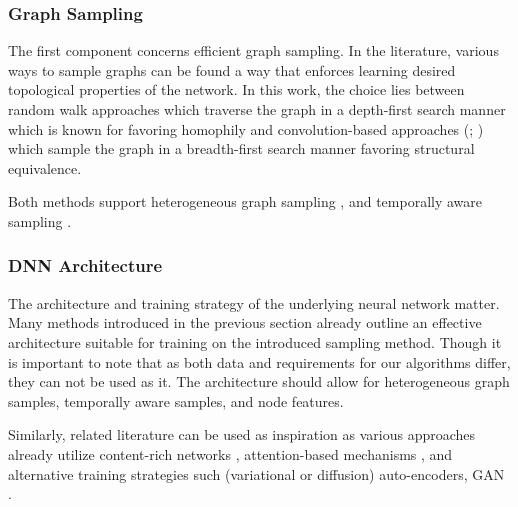 \documentclass[
acmsmall,
nonacm,
screen,
acmthm]{acmart}
\begin{document}
\hypertarget{graph-sampling}{%
\subsubsection{Graph Sampling}\label{graph-sampling}}

The first component concerns efficient graph sampling. In the
literature, various ways to sample graphs can be found a way that
enforces learning desired topological properties of the network. In this
work, the choice lies between random walk approaches
\citep{perozziDeepWalkOnlineLearning2014, groverNode2vecScalableFeature2016, groverNode2vecScalableFeature2016}
which traverse the graph in a depth-first search manner which is known
for favoring homophily and convolution-based approaches
(\citet{kipfSemiSupervisedClassificationGraph2017a};
\citet{hamiltonInductiveRepresentationLearning2018}) which sample the
graph in a breadth-first search manner favoring structural equivalence.

Both methods support heterogeneous graph sampling
\citep{wuAuthor2VecFrameworkGenerating2020, yingGraphConvolutionalNeural2018, yangHeterogeneousNetworkRepresentation2020, dongMetapath2vecScalableRepresentation2017, wangHeterogeneousGraphAttention2021},
and temporally aware sampling
\citep{nguyenContinuousTimeDynamicNetwork2018, wuSageDyNovelSampling2021, dasguptaHyTEHyperplanebasedTemporally2018}.

\hypertarget{dnn-architecture}{%
\subsubsection{DNN Architecture}\label{dnn-architecture}}

The architecture and training strategy of the underlying neural network
matter. Many methods introduced in the previous section already outline
an effective architecture suitable for training on the introduced
sampling method. Though it is important to note that as both data and
requirements for our algorithms differ, they can not be used as it. The
architecture should allow for heterogeneous graph samples, temporally
aware samples, and node features.

Similarly, related literature can be used as inspiration as various
approaches already utilize content-rich networks
\citep{wuAuthor2VecFrameworkGenerating2020, yingGraphConvolutionalNeural2018},
attention-based mechanisms
\citep{abu-el-haijaWatchYourStep2018, sankarDynamicGraphRepresentation2019, wangHeterogeneousGraphAttention2021},
and alternative training strategies such (variational or diffusion)
auto-encoders, GAN
\citep{liVariationalDiffusionAutoencoders2020, kipfVariationalGraphAutoEncoders2016}.
\end{document}
